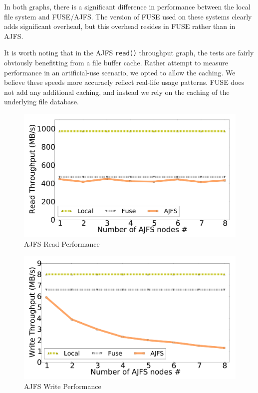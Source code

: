 In both graphs, there is a significant difference in performance between the
local file system and FUSE/AJFS. The version of FUSE used on these systems
clearly adds significant overhead, but this overhead resides in FUSE rather than
in AJFS.

It is worth noting that in the AJFS \texttt{read()} throughput graph, the tests
are fairly obviously benefitting from a file buffer cache. Rather attempt to
measure performance in an artificial-use scenario, we opted to allow the
caching. We believe these speeds more accuraely reflect real-life usage
patterns. FUSE does not add any additional caching, and instead we rely on the
caching of the underlying file database.


\begin{figure}[Ht]
\includegraphics[width=\linewidth]{readperf.pdf}
\caption{AJFS Read Performance}
\label{fig:readperf}
\vspace{-5mm}
\end{figure}

\begin{figure}[Ht]
\includegraphics[width=\linewidth]{writeperf.pdf}
\caption{AJFS Write Performance}
\label{fig:writeperf}
\vspace{-5mm}
\end{figure}

